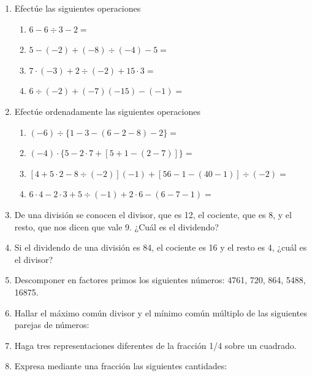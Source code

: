 \documentclass[twoside]{article}
\begin{document}
\begin{enumerate}
\item Efectúe las siguientes operaciones
\begin{enumerate}
\item $6-6\div 3-2=$
\item $5-(-2)+(-8)\div (-4)-5=$
\item $7\cdot (-3)+2\div (-2)+15\cdot 3=$
\item $6\div (-2)+(-7)(-15)-(-1)=$
\end{enumerate}
\item Efectúe ordenadamente las siguientes operaciones
\begin{enumerate}
\item $(-6)\div \{1-3-(6-2-8)-2\}=$
\item $(-4)\cdot \{5-2\cdot 7+[5+1-(2-7)]\}=$
\item $[4+5\cdot 2-8\div (-2)](-1)+[56-1-(40-1)]\div (-2)=$
\item $6\cdot 4-2\cdot 3+5\div (-1)+2\cdot 6- (6-7-1)=$
\end{enumerate}
\item De una división se conocen el divisor, que es 12, el cociente, que es 8, y el resto, que nos dicen que vale 9. ¿Cuál es el dividendo?
\item Si el dividendo de una división es 84, el cociente es 16 y el resto es 4, ¿cuál es el divisor?
\item Descomponer en factores primos los siguientes números: 4761, 720, 864, 5488, 16875.
\item Hallar el máximo común divisor y el mínimo común múltiplo de las siguientes parejas de números:
\begin{enumerate}
\end{enumerate}
\item Haga tres representaciones diferentes de la fracción 1/4 sobre un cuadrado.
\item Expresa mediante una fracción las siguientes cantidades:
\begin{enumerate}
\end{enumerate}
\end{enumerate}
\end{document}
